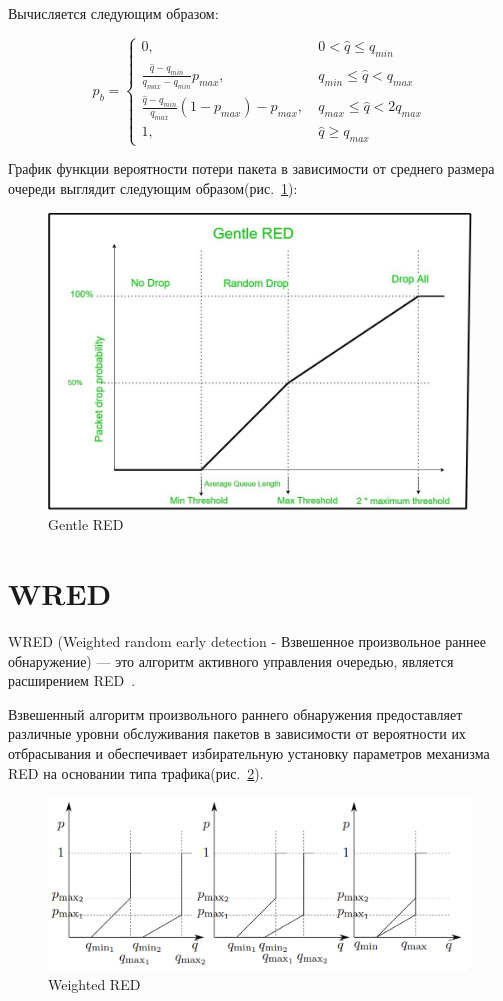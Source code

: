 Вычисляется следующим образом:

$$
p_{b} =\begin{cases}
	0, &  \  0 < \hat{q} \leq q_{min} 
	\\
	\frac{\hat{q} - q_{min}}{q_{max} - q_{min}} p_{max}, & \ q_{min} \leqslant \hat{q} < q_{max} 
	\\
	\frac{\hat{q} - q_{min}}{q_{max}}(1-p_{max}) - p_{max}, & \ q_{max} \leqslant \hat{q} < 2q_{max} 
	\\
	1, &  \ \hat{q} \geqslant  q_{max} 
\end{cases}
$$

График функции вероятности потери пакета в зависимости от среднего размера очереди выглядит следующим образом(рис.~\ref{fig:2.2}):

\begin{figure}[!h]
  \centering
  \includegraphics[width=0.7\linewidth]{image/GentleRED.jpg}
  \caption{Gentle RED}
  \label{fig:2.2}
\end{figure}

\section{WRED}

WRED (Weighted random early detection - Взвешенное произвольное раннее обнаружение) — это алгоритм активного управления очередью, является расширением RED~\cite{WRED}.

Взвешенный алгоритм произвольного раннего обнаружения предоставляет различные уровни обслуживания пакетов в зависимости от вероятности их отбрасывания и обеспечивает избирательную установку параметров механизма RED на основании типа трафика(рис.~\ref{fig:2.3}). 

\begin{figure}[!h]
  \centering
  \includegraphics[width=0.7\linewidth]{image/wred.png}
  \caption{Weighted RED}
  \label{fig:2.3}
\end{figure}

